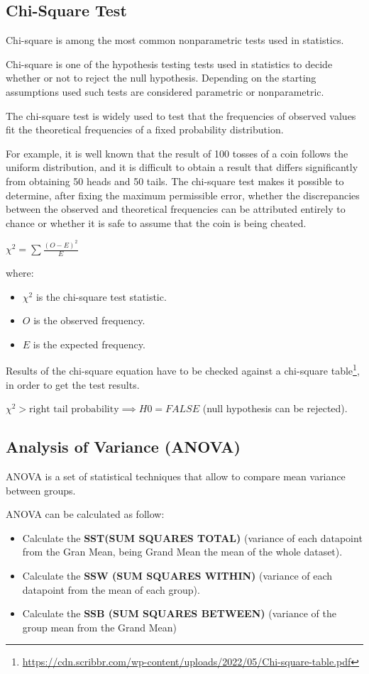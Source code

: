 \documentclass{article}
\begin{document}
\subsection{Chi-Square Test}
Chi-square is among the most common nonparametric tests used in statistics.  

Chi-square is one of the hypothesis testing tests used in statistics to decide whether or not to reject the null hypothesis. 
Depending on the starting assumptions used such tests are considered parametric or nonparametric.

The chi-square test is widely used to test that the frequencies of observed values fit the theoretical frequencies of a fixed probability distribution. 

For example, it is well known that the result of 100 tosses of a coin follows the uniform distribution, and it is difficult to obtain a result that differs significantly from obtaining 50 heads and 50 tails. The chi-square test makes it possible to determine, after fixing the maximum permissible error, whether the discrepancies between the observed and theoretical frequencies can be attributed entirely to chance or whether it is safe to assume that the coin is being cheated.

$\displaystyle \chi^2 = \sum \frac{(O - E)^2}{E}$

where: 
\begin{itemize}
    \item $\chi^2$ is the chi-square test statistic.
    \item $O$ is the observed frequency.
    \item $E$ is the expected frequency.
\end{itemize}

Results of the chi-square equation have to be checked against a chi-square table\footnote{\url{https://cdn.scribbr.com/wp-content/uploads/2022/05/Chi-square-table.pdf}}, in order to get the test results. 

$\chi^2 > \text{right tail probability} \implies H0 = FALSE $ (null hypothesis can be rejected).

\subsection{Analysis of Variance (ANOVA)}
ANOVA is a set of statistical techniques that allow to compare mean variance between groups. 

ANOVA can be calculated as follow:
\begin{itemize}
    \item Calculate the \textbf{SST(SUM SQUARES TOTAL)} (variance of each datapoint from the Gran Mean, being Grand Mean the mean of the whole dataset).
    \item Calculate the \textbf{SSW (SUM SQUARES WITHIN)} (variance of each datapoint from the mean of each group).
    \item Calculate the \textbf{SSB (SUM SQUARES BETWEEN)} (variance of the group mean from the Grand Mean)
\end{itemize}
\end{document}
